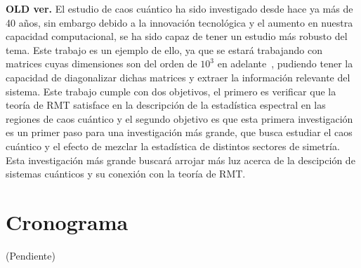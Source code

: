 \documentclass[spanish,titlepage,table]{practicas}
\begin{document}
\textbf{OLD ver.}
El estudio de caos cuántico ha sido investigado desde hace ya más de 40 años, sin embargo debido a la innovación tecnológica y el aumento en nuestra capacidad 
computacional, se ha sido capaz de tener un estudio más robusto del tema. Este trabajo es un ejemplo de ello, ya que 
se estará trabajando con matrices cuyas dimensiones son del orden de $10^{3}$ en adelante~\cite{Zhang2010}, 
pudiendo tener la capacidad de diagonalizar dichas matrices y extraer la información relevante del sistema.
Este trabajo cumple con dos objetivos, el primero es verificar que la teoría de RMT satisface en la descripción de la 
estadística espectral en las regiones de caos cuántico y el segundo objetivo es que esta primera investigación es 
un primer paso para una investigación más grande, que busca estudiar el caos cuántico y el efecto de mezclar la estadística 
de distintos sectores de simetría. Esta investigación más grande buscará arrojar más luz acerca de la descipción de sistemas cuánticos y su conexión con la teoría de RMT.

\section{Cronograma}
(Pendiente)


\end{document}
